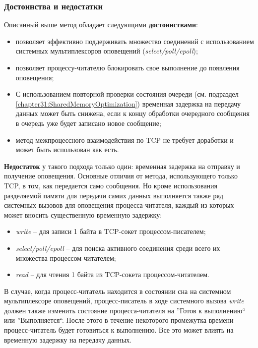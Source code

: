 \subsubsection{Достоинства и недостатки}

Описанный выше метод обладает следующими \textbf{достоинствами}:
\begin{itemize}
\item позволяет эффективно поддерживать множество соединений с использованием системных мультиплексоров оповещений (\textit{select/poll/epoll});
\item позволяет процессу-читателю блокировать свое выполнение до появления оповещения;
\item С использованием повторной проверки состояния очереди (см. подраздел \ref{chapter31:SharedMemoryOptimization}) временная задержка на передачу данных может быть снижена, если к концу обработки очередного сообщения в очередь уже будет записано новое сообщение;
\item метод межпроцессного взаимодействия по TCP не требует доработки и может быть использован как есть.
\end{itemize}

\textbf{Недостаток} у такого подхода только один: временная задержка на отправку и получение оповещения. Основные отличия от метода, использующего только TCP, в том, как передается само сообщения. Но кроме использования разделяемой памяти для передачи самих данных выполняется также ряд системных вызовов для оповещения процесса-читателя, каждый из которых может вносить существенную временную задержку:
\begin{itemize}
\item \textit{write} -- для записи 1 байта в TCP-сокет процессом-писателем;
\item \textit{select/poll/epoll} -- для поиска активного соединения среди всего их множества процессом-читателем;
\item \textit{read} -- для чтения 1 байта из TCP-сокета процессом-читателем.
\end{itemize}

В случае, когда процесс-читатель находится в состоянии сна на системном мультиплексоре оповещений, процесс-писатель в ходе системного вызова \textit{write} должен также изменить состояние процесса-читателя на ''Готов к выполнению`` или ''Выполняется``. После этого в течение некоторого промежутка времени процесс-читатель будет готовиться к выполнению. Все это может влиять на временную задержку на передачу данных.

